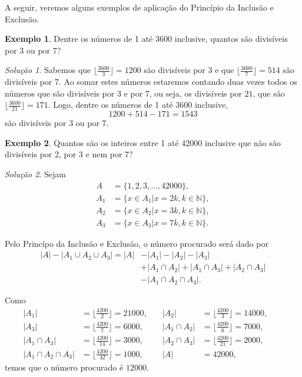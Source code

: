 \documentclass[]{book}
\theoremstyle{definition}
\theoremstyle{definition}
\newtheorem{example}{Exemplo}[chapter]
\theoremstyle{definition}
\theoremstyle{remark}
\newtheorem*{solution}{Solução}
\begin{document}
A seguir, veremos alguns exemplos de aplicação do Princípio da Inclusão e Exclusão.

\begin{example}
\protect\hypertarget{exm:unnamed-chunk-68}{}{\label{exm:unnamed-chunk-68} }Dentre os números de 1 até 3600 inclusive, quantos são divisíveis por 3 ou por 7?
\end{example}

\begin{solution}
\iffalse{} {Solução. } \fi{}Sabemos que \(\big\lfloor{\frac{3600}{3}}\big\rfloor=1200\) são divisíveis por \(3\) e que \(\big\lfloor{\frac{3600}{7}}\big\rfloor=514\) são divisíveis por 7.
Ao somar estes números estaremos contando duas vezes todos os números que são divisíveis por \(3\) e por \(7\), ou seja, os divisíveis por \(21\), que são \(\big\lfloor{\frac{3600}{21}}\big\rfloor=171\).
Logo, dentre os números de 1 até 3600 inclusive,
\[1200 + 514 - 171 = 1543\]
são divisíveis por 3 ou por 7.
\end{solution}

\begin{example}
\protect\hypertarget{exm:div3Numeros}{}{\label{exm:div3Numeros} }Quantos são os inteiros entre 1 até 42000 inclusive que não são divisíveis por 2, por 3 e nem por 7?
\end{example}

\begin{solution}
\iffalse{} {Solução. } \fi{}Sejam
\begin{align}
A &= \{1, 2, 3, \ldots, 42000\}, \\
A_1 &= \{x \in A_1 | x = 2k, k \in \mathbb{N}\}, \\
A_2 &= \{x \in A_2 | x = 3k, k \in \mathbb{N}\}, \\
A_3 &= \{x \in A_3 | x = 7k, k \in \mathbb{N}\}.
\end{align}

Pelo Princípo da Inclusão e Exclusão, o número procurado será dado por
\begin{align} 
|A| - |A_1\cup A_2 \cup A_3| = |A| &- |A_1| - |A_2| - |A_3| \\
 &+ |A_1 \cap A_2| + |A_1 \cap A_3|+ |A_2 \cap A_3| \\ 
 &- |A_1 \cap A_2 \cap A_3|.
\end{align}

Como
\begin{align} 
|A_1| &= \bigg\lfloor{\frac{4200}{2}}\bigg\rfloor=21000, &\quad 
  |A_2| &= \bigg\lfloor{\frac{4200}{3}}\bigg\rfloor=14000, &\quad \\
  |A_3| &= \bigg\lfloor{\frac{4200}{7}}\bigg\rfloor=6000, &\quad 
|A_1 \cap A_2| &= \bigg\lfloor{\frac{4200}{6}}\bigg\rfloor=7000, &\quad \\
  |A_1 \cap A_3| &= \bigg\lfloor{\frac{4200}{14}}\bigg\rfloor=3000, &\quad 
  |A_2 \cap A_3| &= \bigg\lfloor{\frac{4200}{21}}\bigg\rfloor=2000, &\quad\\
|A_1 \cap A_2 \cap A_3| &= \bigg\lfloor{\frac{4200}{42}}\bigg\rfloor=1000, &\quad
  |A| &= 42000,
\end{align}
temos que o número procurado é \(12000\).
\end{solution}
\end{document}
